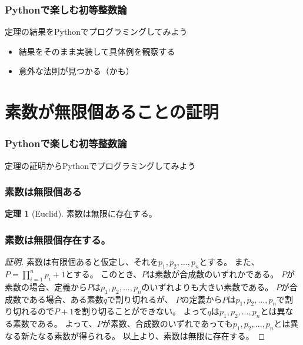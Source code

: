 \documentclass[dvipdfmx,11pt,notheorems]{beamer}
\theoremstyle{definition}
\newtheorem{theorem}{定理}
\begin{document}
\begin{frame}\frametitle{Pythonで楽しむ初等整数論}

\begin{block}{定理の結果をPythonでプログラミングしてみよう}
\begin{itemize}
\item 結果をそのまま実装して具体例を観察する
\item 意外な法則が見つかる（かも）
\end{itemize}
\end{block}

\end{frame}

\section{素数が無限個あることの証明}

\begin{frame}\frametitle{Pythonで楽しむ初等整数論}
\huge{定理の証明からPythonでプログラミングしてみよう}
\end{frame}

\begin{frame}\frametitle{素数は無限個ある}

\begin{theorem}[Euclid]
素数は無限に存在する。
\end{theorem}


\end{frame}

\begin{frame}\frametitle{素数は無限個存在する。}


\begin{proof}[証明]

素数は有限個あると仮定し、それを$p_{1}, p_{2}, \dots,  p_{n}$とする。
また、$P = \displaystyle \prod^{n}_{i=1}p_{i} + 1$とする。
このとき、$P$は素数が合成数のいずれかである。
$P$が素数の場合、定義から$P$は$p_{1}, p_{2}, \dots,  p_{n}$のいずれよりも大きい素数である。
$P$が合成数である場合、ある素数$q$で割り切れるが、
$P$の定義から$P$は$p_{1}, p_{2}, \dots,  p_{n}$で割り切れるので$P+1$を割り切ることができない。
よって$q$は$p_{1}, p_{2}, \dots,  p_{n}$とは異なる素数である。
よって、$P$が素数、合成数のいずれであっても$p_{1}, p_{2}, \dots,  p_{n}$とは異なる新たなる素数が得られる。
以上より、素数は無限に存在する。
\end{proof}

\end{frame}
\end{document}

